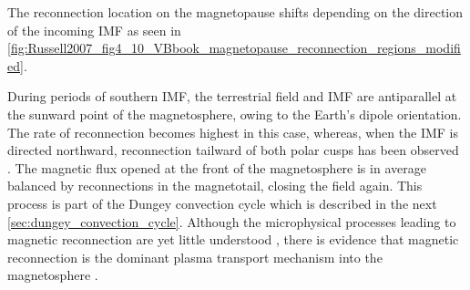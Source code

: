 The reconnection location on the magnetopause shifts depending on the direction of the incoming IMF as seen in \autoref{fig:Russell2007_fig4_10_VBbook_magnetopause_reconnection_regions_modified}.
\begin{figure}[b!]
\end{figure}
During periods of southern IMF, the terrestrial field and IMF are antiparallel at the sunward point of the magnetosphere, owing to the Earth's dipole orientation. The rate of reconnection becomes highest in this case, whereas, when the IMF is directed northward, reconnection tailward of both polar cusps has been observed \citep{Phan2005}. The magnetic flux opened at the front of the magnetosphere is in average balanced by reconnections in the magnetotail, closing the field again. This process is part of the Dungey convection cycle which is described in the next \autoref{sec:dungey_convection_cycle}.
Although the microphysical processes leading to magnetic reconnection are yet little understood \citep{Phan2005}, there is evidence that magnetic reconnection is the dominant plasma transport mechanism into the magnetosphere \citep{DeKeyser2005}.

